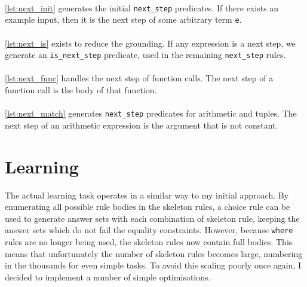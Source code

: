  
\mbox{} \\
\ref{lst:next_init} generates the initial \lstinline!next_step! predicates. If there exists an example input, then it is the next step of some arbitrary term \lstinline!e!. \\

 
\mbox{} \\
\ref{lst:next_is} exists to reduce the grounding. If any expression is a next step, we generate an \lstinline{is_next_step} predicate, used in the remaining \lstinline{next_step} rules.\\

 
\mbox{} \\
\ref{lst:next_func} handles the next step of function calls. The next step of a function call is the body of that function. \\

 
\mbox{} \\
\ref{lst:next_match} generates \lstinline{next_step} predicates for arithmetic and tuples. The next step of an arithmetic expression is the argument that is not constant. %

\section{Learning}
The actual learning task operates in a similar way to my initial approach. By enumerating all possible rule bodies in the skeleton rules, a choice rule can be used to generate answer sets with each combination of skeleton rule, keeping the answer sets which do not fail the equality constraints. However, because \lstinline!where! rules are no longer being used, the skeleton rules now contain full bodies. This means that unfortunately the number of skeleton rules becomes large, numbering in the thousands for even simple tasks. To avoid this scaling poorly once again, I decided to implement a number of simple optimisations.%

